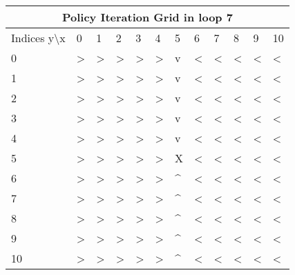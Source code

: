 \documentclass{article}
\begin{document}



\begin{center}
\begin{tabular}{ |l | l | l | l | l | l | l | l | l | l | l | l|}
\hline
\multicolumn{12}{|c|}{Policy Iteration Grid in loop 7}\\
\hline
Indices y\textbackslash x &0 & 1 & 2 & 3 & 4 & 5 & 6 & 7 & 8 & 9 & 10 \\ 

\hline
0 & \textgreater & \textgreater & \textgreater & \textgreater & \textgreater & v & \textless & \textless & \textless & \textless & \textless\\
1 & \textgreater & \textgreater & \textgreater & \textgreater & \textgreater & v & \textless & \textless & \textless & \textless & \textless\\
2 & \textgreater & \textgreater & \textgreater & \textgreater & \textgreater & v & \textless & \textless & \textless & \textless & \textless\\
3 & \textgreater & \textgreater & \textgreater & \textgreater & \textgreater & v & \textless & \textless & \textless & \textless & \textless\\
4 & \textgreater & \textgreater & \textgreater & \textgreater & \textgreater & v & \textless & \textless & \textless & \textless & \textless\\
5 & \textgreater & \textgreater & \textgreater & \textgreater & \textgreater & X & \textless & \textless & \textless & \textless & \textless\\
6 & \textgreater & \textgreater & \textgreater & \textgreater & \textgreater & \textasciicircum & \textless & \textless & \textless & \textless & \textless\\
7 & \textgreater & \textgreater & \textgreater & \textgreater & \textgreater & \textasciicircum & \textless & \textless & \textless & \textless & \textless\\
8 & \textgreater & \textgreater & \textgreater & \textgreater & \textgreater & \textasciicircum & \textless & \textless & \textless & \textless & \textless\\
9 & \textgreater & \textgreater & \textgreater & \textgreater & \textgreater & \textasciicircum & \textless & \textless & \textless & \textless & \textless\\
10 & \textgreater & \textgreater & \textgreater & \textgreater & \textgreater & \textasciicircum & \textless & \textless & \textless & \textless & \textless\\
\hline
\end{tabular}
\end{center}
\end{document}
